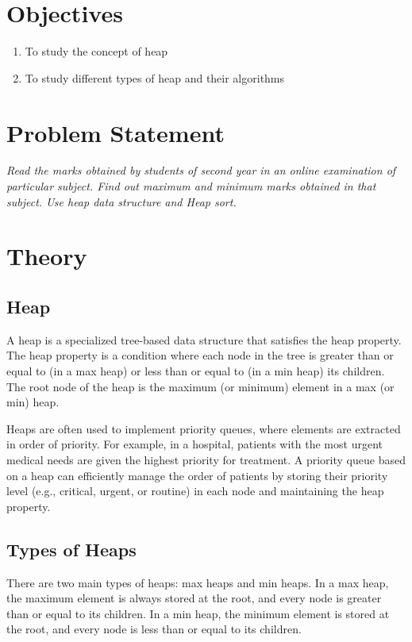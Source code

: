 \documentclass[11pt]{article}
\begin{document}
\tableofcontents
\thispagestyle{empty}
\clearpage

\setcounter{page}{1}

\section{Objectives}
\begin{enumerate}
    \item To study the concept of heap
    \item To study different types of heap and their algorithms
\end{enumerate}

\section{Problem Statement}
\textit{Read the marks obtained by students of second year in an online examination of
    particular subject. Find out maximum and minimum marks obtained in that subject. Use
    heap data structure and Heap sort.}
\section{Theory}

\subsection{Heap}

A heap is a specialized tree-based data structure that satisfies the heap property. The heap property is a condition where each node in the tree is greater than or equal to (in a max heap) or less than or equal to (in a min heap) its children. The root node of the heap is the maximum (or minimum) element in a max (or min) heap.

Heaps are often used to implement priority queues, where elements are extracted in order of priority. For example, in a hospital, patients with the most urgent medical needs are given the highest priority for treatment. A priority queue based on a heap can efficiently manage the order of patients by storing their priority level (e.g., critical, urgent, or routine) in each node and maintaining the heap property.

\subsection{Types of Heaps}

There are two main types of heaps: max heaps and min heaps. In a max heap, the maximum element is always stored at the root, and every node is greater than or equal to its children. In a min heap, the minimum element is stored at the root, and every node is less than or equal to its children.
\end{document}
